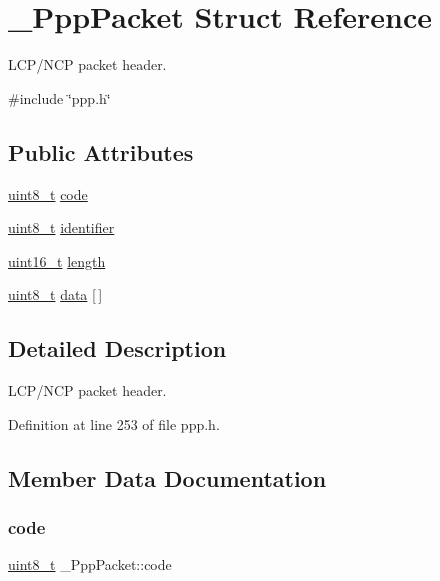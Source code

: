 \hypertarget{struct__PppPacket}{}\section{\+\_\+\+Ppp\+Packet Struct Reference}
\label{struct__PppPacket}


L\+C\+P/\+N\+CP packet header.  




{\ttfamily \#include \char`\"{}ppp.\+h\char`\"{}}

\subsection*{Public Attributes}
\begin{DoxyCompactItemize}
\item 
\hyperlink{stdint_8h_aba7bc1797add20fe3efdf37ced1182c5}{uint8\+\_\+t} \hyperlink{struct__PppPacket_a1c6dd646e47c27ba8e54e9078c6adbf4}{code}
\item 
\hyperlink{stdint_8h_aba7bc1797add20fe3efdf37ced1182c5}{uint8\+\_\+t} \hyperlink{struct__PppPacket_a734a4f5764bd33432d57f57e9745bbe5}{identifier}
\item 
\hyperlink{stdint_8h_a273cf69d639a59973b6019625df33e30}{uint16\+\_\+t} \hyperlink{struct__PppPacket_a03d503440e0bdda2779c01512d0c23fc}{length}
\item 
\hyperlink{stdint_8h_aba7bc1797add20fe3efdf37ced1182c5}{uint8\+\_\+t} \hyperlink{struct__PppPacket_abe3baab9c0ecb72abb01c6ed3550e942}{data} \mbox{[}$\,$\mbox{]}
\end{DoxyCompactItemize}


\subsection{Detailed Description}
L\+C\+P/\+N\+CP packet header. 

Definition at line 253 of file ppp.\+h.



\subsection{Member Data Documentation}
\mbox{\label{struct__PppPacket_a1c6dd646e47c27ba8e54e9078c6adbf4}} 
\subsubsection{\texorpdfstring{code}{code}}
{\footnotesize\ttfamily \hyperlink{stdint_8h_aba7bc1797add20fe3efdf37ced1182c5}{uint8\+\_\+t} \+\_\+\+Ppp\+Packet\+::code}



